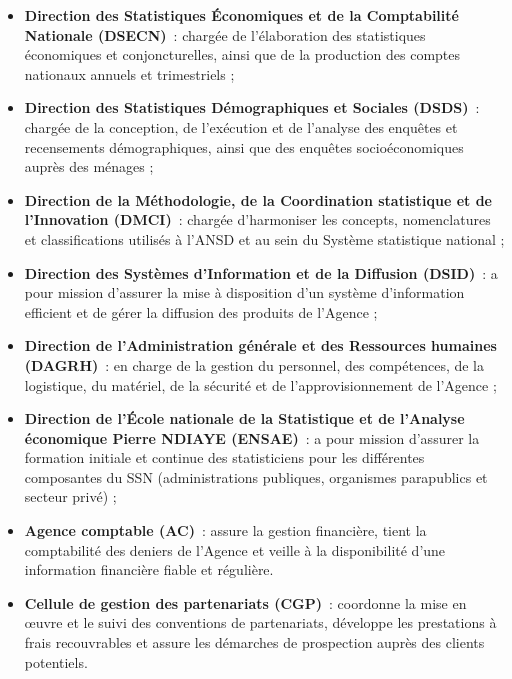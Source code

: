 \documentclass[12pt,a4paper,oneside]{report}
\begin{document}
\begin{itemize}

\item \textbf{Direction des Statistiques Économiques et de la Comptabilité Nationale (DSECN)}~: chargée de l’élaboration des statistiques économiques et conjoncturelles, ainsi que de la production des
comptes nationaux annuels et trimestriels ;

\item \textbf{Direction des Statistiques Démographiques et Sociales (DSDS)}~: chargée de la conception, de l’exécution et de l’analyse des enquêtes et recensements démographiques, ainsi
que des enquêtes socioéconomiques auprès des ménages ;

\item \textbf{Direction de la Méthodologie, de la Coordination statistique et de l’Innovation (DMCI)}~: chargée d’harmoniser les concepts, nomenclatures et classifications utilisés à l’ANSD et au sein du Système
statistique national ;

\item \textbf{Direction des Systèmes d’Information et de la Diffusion (DSID)}~: a pour mission d’assurer la mise à disposition d’un système d’information efficient et de gérer la diffusion
des produits de l’Agence ;

\item \textbf{Direction de l’Administration générale et des Ressources humaines (DAGRH)}~: en charge de la gestion du personnel, des compétences, de la logistique, du matériel, de la sécurité et de
l’approvisionnement de l’Agence ;

\item \textbf{Direction de l’École nationale de la Statistique et de l’Analyse économique Pierre NDIAYE (ENSAE)}~: a pour mission d’assurer la formation initiale et continue des statisticiens pour les différentes composantes
du SSN (administrations publiques, organismes parapublics et secteur privé) ;

\item \textbf{Agence comptable (AC)}~: assure la gestion financière, tient la comptabilité des deniers de l’Agence et veille à la disponibilité d’une
information financière fiable et régulière.

\item \textbf{Cellule de gestion des partenariats (CGP)}~: coordonne la mise en œuvre et le suivi des conventions de partenariats, développe les prestations à frais
recouvrables et assure les démarches de prospection auprès des clients potentiels.

\end{itemize}
\end{document}
